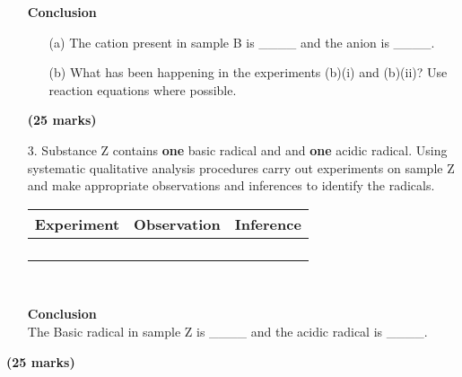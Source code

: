 \begin{enumerate}
\begin{center}
\end{center}


\textbf{Conclusion}\\

\begin{enumerate}
\item[(a)] The cation present in sample B is \_\_\_\_ and the anion is \_\_\_\_.
\item[(b)] What has been happening in the experiments (b)(i) and (b)(ii)? Use reaction equations where possible.
\end{enumerate}

\raggedleft \textbf{(25 marks)}

\raggedright

\item[3.] Substance Z contains \textbf{one} basic radical and and \textbf{one} acidic radical. Using systematic qualitative analysis procedures carry out experiments on sample Z and make appropriate observations and inferences to identify the radicals.\\

\begin{center}
\begin{tabular}{|p{4cm}|p{4cm}|p{4cm}|}
\hline
\textbf{Experiment}&\textbf{Observation}&\textbf{Inference}\\ \hline
&&\\
&&\\
&&\\
&&\\
\hline
\end{tabular}\\
\end{center}

\textbf{Conclusion}\\
\vspace{6pt}
The Basic radical in sample Z is \_\_\_\_ and the acidic radical is \_\_\_\_.\\


\end{enumerate}

\raggedleft \textbf{(25 marks)}\\

\raggedright
